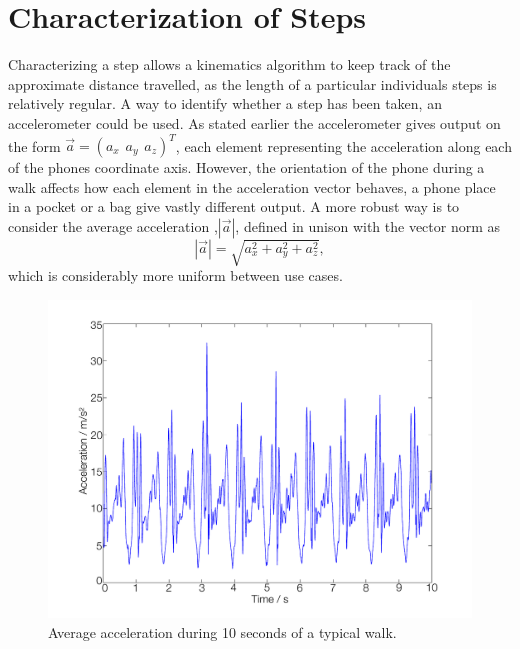 \documentclass{LTHthesis}
\begin{document}
\section{Characterization of Steps}
%
Characterizing a step allows a kinematics algorithm to keep track of the approximate distance travelled, as the length of a particular individuals steps is relatively regular. A way to identify whether a step has been taken, an accelerometer could be used. As stated earlier the accelerometer gives output on the form $\vec a = (a_x \hspace{5pt} a_y \hspace{5pt} a_z)^T$, each element representing the acceleration along each of the phones  coordinate axis. However, the orientation of the phone during a walk affects how each element in the acceleration vector behaves, a phone place in a pocket or a bag give vastly different output. A more robust way is to consider the average acceleration ,$|\vec a|$, defined in unison with the vector norm as 
%
\begin{equation}
|\vec a| = \sqrt{a_x^2+a_y^2+a_z^2},
\end{equation}
%
which is considerably more uniform between use cases.
%
\begin{figure}[!hbt]

\includegraphics[width=1\textwidth ]{images/kinematic/avr_acc}
\caption{Average acceleration during 10 seconds of a typical walk.}\label{avr_acc}
\end{figure}
\end{document}
